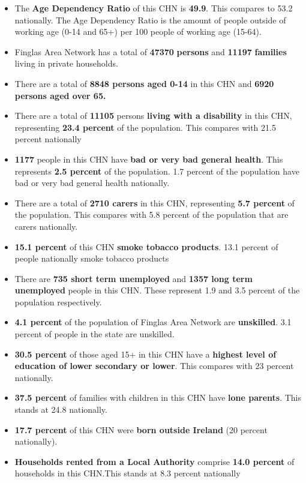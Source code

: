 \documentclass{article}
\begin{document}
\begin{itemize}

\item The \textbf{Age Dependency Ratio} of this CHN is  \textbf{49.9}. This compares to 53.2 nationally. The Age Dependency Ratio is the amount of people outside of working age (0-14 and 65+) per 100 people of working age (15-64). 

\item Finglas Area Network has a total of \textbf{\num{47370}} \textbf{persons} and  \textbf{\num{11197}} \textbf{families} living in private households.

\item There are a total of \textbf{\num{8848} persons aged 0-14} in this CHN and \textbf{\num{6920} persons aged over 65.} 

\item There are a total of \textbf{\num{11105}} persons \textbf{living with a disability} in this CHN, representing \textbf{23.4 percent} of the population. This compares with  21.5 percent nationally

\item \textbf{\num{1177}} people in this CHN have \textbf{bad or very bad general health}. This represents \textbf{2.5 percent} of the population. 1.7 percent of the population have bad or very bad general health nationally. 

\item There are a total of \textbf{\num{2710} carers} in this CHN, representing \textbf{5.7 percent} of the population. This compares with 5.8 percent of the population that are carers nationally. 

\item \textbf{15.1 percent} of this CHN \textbf{smoke tobacco products}. 13.1 percent of people nationally smoke tobacco products

\item There are \textbf{\num{735} short term unemployed} and \textbf{\num{1357} long term unemployed} people in this CHN. These represent 1.9 and 3.5 percent of the population respectively.

\item  \textbf{4.1 percent} of the population of Finglas Area Network are \textbf{unskilled}. 3.1 percent of people in the state are unskilled.

\item \textbf{30.5 percent} of those aged 15+ in this CHN have a \textbf{highest level of education of lower secondary or lower}. This compares with 23 percent nationally. 

\item \textbf{37.5 percent} of families with children in this CHN have \textbf{lone parents}. This stands at 24.8 nationally.

\item \textbf{17.7 percent} of this CHN were \textbf{born outside Ireland} (20 percent nationally).

\item \textbf{Households rented from a Local Authority} comprise \textbf{14.0 percent} of households in this CHN.This stands at 8.3 percent nationally

\end{itemize}
\end{document}
